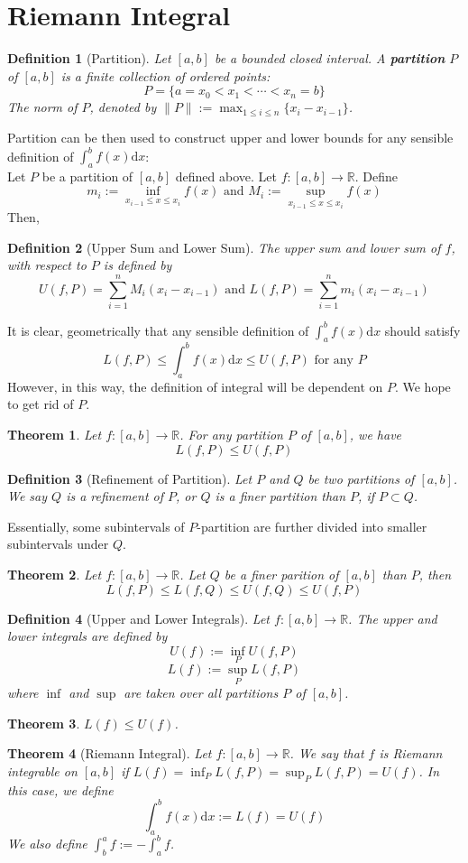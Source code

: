 \documentclass[12pt]{article}
\newcommand{\diff}{\mathrm{d}}
\newtheorem{definition}{Definition}[section]
\newtheorem{theorem}{Theorem}[section]
\theoremstyle{definition}
\begin{document}
\section{Riemann Integral}
\begin{definition}[Partition]
\normalfont Let $[a,b]$ be a bounded closed interval. A \textbf{partition} $P$ of $[a,b]$ is a finite collection of ordered points:
\[
P=\{a=x_0<x_1<\cdots<x_n=b\}
\]
The norm of $P$, denoted by $\|P\|:=\max_{1\leq i\leq n} \{x_i-x_{i-1}\}$.
\end{definition}
Partition can be then used to construct upper and lower bounds for any sensible definition of $\int_a^bf(x)\diff x$:\\
Let $P$ be a partition of $[a,b]$ defined above. Let $f:[a,b]\to \mathbb{R}$. Define
\[
m_i:=\inf_{x_{i-1}\leq x\leq x_i}f(x)\text{ and }M_i:=\sup_{x_{i-1}\leq x\leq x_i}f(x)
\]
Then,
\begin{definition}[Upper Sum and Lower Sum]
\normalfont The upper sum and lower sum of $f$, with respect to $P$ is defined by
\[
U(f,P)=\sum_{i=1}^n M_i(x_i-x_{i-1})\text{ and }L(f,P)=\sum_{i=1}^n m_i(x_i-x_{i-1})
\]
\end{definition}
It is clear, geometrically that any sensible definition of $\int_a^bf(x)\diff x$ should satisfy
\[
L(f,P)\leq \int_a^bf(x)\diff x\leq U(f,P)\text{ for any }P
\]
However, in this way, the definition of integral will be dependent on $P$. We hope to get rid of $P$.
\begin{theorem}
\normalfont Let $f:[a,b]\to \mathbb{R}$. For any partition $P$ of $[a,b]$, we have
\[
L(f,P)\leq U(f,P)
\]
\end{theorem}
\begin{definition}[Refinement of Partition]
\normalfont Let $P$ and $Q$ be two partitions of $[a,b]$. We say $Q$ is a refinement of $P$, or $Q$ is a finer partition than $P$, if $P\subset Q$.
\end{definition}
Essentially, some subintervals of $P$-partition are further divided into smaller subintervals under $Q$.
\begin{theorem}
\normalfont Let $f:[a,b]\to \mathbb{R}$. Let $Q$ be a finer parition of $[a,b]$ than $P$, then
\[
L(f,P)\leq L(f,Q)\leq U(f,Q)\leq U(f,P)
\]
\end{theorem}
\begin{definition}[Upper and Lower Integrals]
\normalfont Let $f:[a,b]\to\mathbb{R}$. The upper and lower integrals are defined by
\[
U(f):=\inf_P U(f,P)
\]
\[
L(f):=\sup_P L(f,P)
\]
where $\inf$ and $\sup$ are taken over all partitions $P$ of $[a,b]$.
\end{definition}
\begin{theorem}$L(f)\leq U(f)$.\end{theorem}
\begin{theorem}[Riemann Integral]
\normalfont Let $f:[a,b]\to\mathbb{R}$. We say that $f$ is Riemann integrable on $[a,b]$ if $L(f)=\inf_P L(f,P)=\sup_P L(f,P)=U(f)$. In this case, we define
\[
\int_a^b f(x)\diff x:=L(f)=U(f)
\]
We also define $\int_b^a f:=-\int_a^b f$.
\end{theorem}
\end{document}
